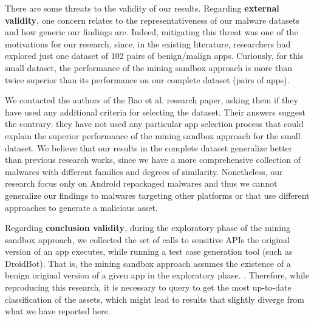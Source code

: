 
There are some threats to the validity of our results.
Regarding {\bf external validity}, one concern relates to the 
representativeness of our malware datasets and how generic our findings are.
Indeed, mitigating this threat was one of the motivations for our research,
since, in the existing literature, researchers had explored just
one dataset of 102 pairs of benign/malign apps. Curiously,
for this small dataset, the performance of the
mining sandbox approach is more than twice superior
than its performance on our complete dataset (\apps pairs of
apps).

We contacted the authors of the Bao et al. research paper, asking them
if they have used any additional criteria for selecting the
dataset. Their answers suggest the contrary: they have not used
any particular app selection process that
could explain the superior performance of the mining
sandbox approach for the small dataset. We believe that
our results in the complete dataset generalize better than previous research works,
since we have a more comprehensive collection of malwares with different
families and degrees of similarity. Nonetheless, our
research focus only on Android repackaged malwares and thus we
cannot generalize our findings to malwares targeting
other platforms or that use different approaches to
generate a malicious asset.



Regarding {\bf conclusion validity}, during the exploratory phase of the mining sandbox approach,
we collected the set of calls to sensitive APIs the original version of
an app executes, while running a test case generation tool (such as
DroidBot). That is, the mining sandbox approach assumes the existence of a benign original
version of a given app in the exploratory phase. .
Therefore, while reproducing this research, it is necessary to query \vt to get the most
up-to-date classification of the assets, which might lead to results that slightly
diverge from what we have reported here.

